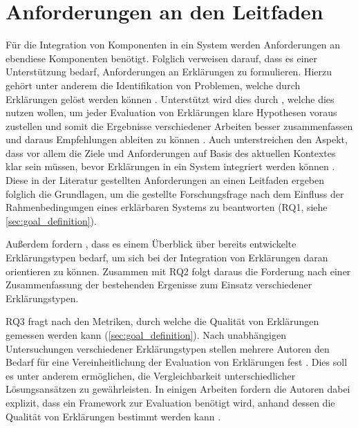 \section{Anforderungen an den Leitfaden}


Für die Integration von Komponenten in ein System werden Anforderungen an ebendiese Komponenten benötigt. Folglich verweisen \citeauthor{chazette_end-users_nodate} darauf, dass es einer Unterstützung bedarf, Anforderungen an Erklärungen zu formulieren. Hierzu gehört unter anderem die Identifikation von Problemen, welche durch Erklärungen gelöst werden können \cite{chazette_end-users_nodate, doshi2017towards}. Unterstützt wird dies durch \citeauthor{waa_evaluating_2021}, welche dies nutzen wollen, um jeder Evaluation von Erklärungen klare Hypothesen voraus zustellen und somit die Ergebnisse verschiedener Arbeiten besser zusammenfassen und daraus Empfehlungen ableiten zu können \cite{waa_evaluating_2021}. Auch \citeauthor{kohl_explainability_2019} unterstreichen den Aspekt, dass vor allem die Ziele und Anforderungen auf Basis des aktuellen Kontextes klar sein müssen, bevor Erklärungen in ein System integriert werden können \cite{kohl_explainability_2019}. Diese in der Literatur gestellten Anforderungen an einen Leitfaden ergeben folglich die Grundlagen, um die gestellte Forschungsfrage nach dem Einfluss der Rahmenbedingungen eines erklärbaren Systems zu beantworten (RQ1, siehe \autoref{sec:goal_definition}).

Außerdem fordern \citeauthor{waa_evaluating_2021}, dass es einem Überblick über bereits entwickelte Erklärungstypen bedarf, um sich bei der Integration von Erklärungen daran orientieren zu können. Zusammen mit RQ2 folgt daraus die Forderung nach einer Zusammenfassung der bestehenden Ergenisse zum Einsatz verschiedener Erklärungstypen.

RQ3 fragt nach den Metriken, durch welche die Qualität von Erklärungen gemessen werden kann (\autoref{sec:goal_definition}). Nach unabhängigen Untersuchungen verschiedener Erklärungstypen stellen mehrere Autoren den Bedarf für eine Vereinheitlichung der Evaluation von Erklärungen fest \cite{cirqueira_scenario-based_2020,zahedi_towards_2019, nunes_systematic_2017, martin_evaluating_2021}. Dies soll es unter anderem ermöglichen, die Vergleichbarkeit unterschiedlicher Lösungsansätzen zu gewährleisten. In einigen Arbeiten fordern die Autoren dabei explizit, dass ein Framework zur Evaluation benötigt wird, anhand dessen die Qualität von Erklärungen bestimmt werden kann \cite{nunes_systematic_2017,sokol_explainability_2020,chari_explanation_2020}.

